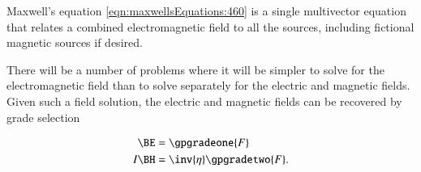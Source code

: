 Maxwell's equation \cref{eqn:maxwellsEquations:460} is a
single multivector equation that relates a combined electromagnetic field to all the sources, including fictional magnetic sources if desired.

There will be a number of problems where it will be simpler to solve for the electromagnetic field than to solve separately for the electric and magnetic fields.
Given such a field solution, the electric and magnetic fields can be recovered by grade selection

\begin{dmath}\label{eqn:isotropicMaxwells:480}
\begin{aligned}
\BE &= \gpgradeone{F} \\
I \BH &= \inv{\eta} \gpgradetwo{F}.
\end{aligned}
\end{dmath}


